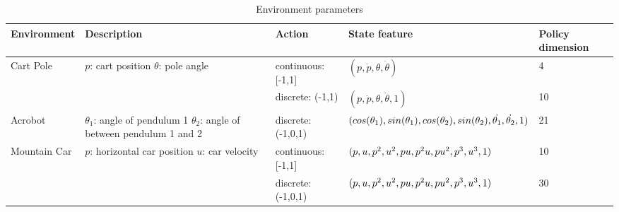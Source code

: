 \begin{table}
    \begin{tabularx}{\textwidth}{ |X|X|X|X|X| }
    \hline
    Environment & Description & Action & State feature & Policy dimension \\ \hline
    Cart Pole & $p$: cart position \newline
                $\theta$: pole angle & continuous: [-1,1] & $(p,\dot{p},\theta,\dot{\theta})$ & 4\\ \cline{3-5}
     &  & discrete: (-1,1) & $(p,\dot{p},\theta,\dot{\theta},1)$ & 10 \\ \hline
    Acrobot & $\theta_1$: angle of pendulum 1 \newline $\theta_2$: angle of between pendulum 1 and 2 & discrete: (-1,0,1) & $(cos(\theta_1), sin(\theta_1), \\ cos(\theta_2), sin(\theta_2), \\ \dot{\theta_1}, \dot{\theta_2}, 1)$ & 21 \\ \hline
    Mountain Car & $p$: horizontal car position \newline $u$: car velocity & continuous: [-1,1] & $(p, u, p^2, u^2, p u, p^2 u, \\ p u^2, p^3, u^3 , 1)$ & 10\\ \cline{3-5}
    & & discrete: (-1,0,1) & $(p, u, p^2, u^2, p u, p^2 u, \\ p u^2, p^3, u^3 , 1)$ & 30\\ \hline
    \end{tabularx}
    \caption{Environment parameters\label{table:envs}}
\end{table}



%
%
